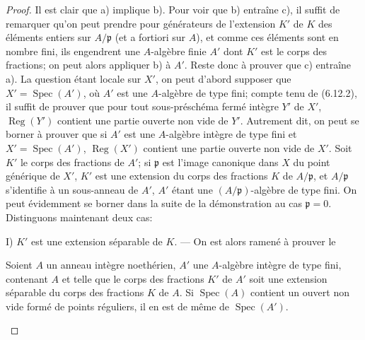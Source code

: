 \begin{proof}
Il est clair que a) implique b). Pour voir que b) entraîne c), il suffit de
remarquer qu'on peut prendre pour générateurs de l'extension $K'$ de $K$
des éléments entiers sur $A/\mathfrak p$ (et a fortiori sur $A$), et comme
ces éléments sont en nombre fini, ils engendrent une $A$-algèbre finie
$A'$ dont $K'$ est le corps des fractions; on peut alors appliquer b) à
$A'$. Reste donc à prouver que c) entraîne a). La question étant locale sur
$X'$, on peut d'abord supposer que $X'=\operatorname{Spec}(A')$, où $A'$
est une $A$-algèbre de type fini; compte tenu de (6.12.2), il suffit de
prouver que pour tout sous-préschéma fermé intègre $Y'$ de $X'$,
$\operatorname{Reg}(Y')$ contient une partie ouverte non vide de $Y'$.
Autrement dit, on peut se borner à prouver que si $A'$ est une $A$-algèbre
intègre de type fini et $X'=\operatorname{Spec}(A')$,
$\operatorname{Reg}(X')$ contient une partie ouverte non vide de $X'$.
Soit $K'$ le corps des fractions de $A'$; si $\mathfrak p$ est l'image
canonique dans $X$ du point générique de $X'$, $K'$ est une extension du
corps des fractions $K$ de $A/\mathfrak p$, et $A/\mathfrak p$
s'identifie à un sous-anneau de $A'$, $A'$ étant une
$(A/\mathfrak p)$-algèbre de type fini. On peut évidemment se borner dans
la suite de la démonstration au cas $\mathfrak p=0$. Distinguons maintenant
deux cas:

I) $K'$ est une extension séparable de $K$. --- On est alors ramené à
prouver le

\begin{lemma}[6.12.4.1]
\label{IV.2.s6.12.4.1-fr}
Soient $A$ un anneau intègre noethérien, $A'$ une $A$-algèbre intègre de
type fini, contenant $A$ et telle que le corps des fractions $K'$ de $A'$
soit une extension séparable du corps des fractions $K$ de $A$. Si
$\operatorname{Spec}(A)$ contient un ouvert non vide formé de points
réguliers, il en est de même de $\operatorname{Spec}(A')$.
\end{lemma}


\end{proof}
